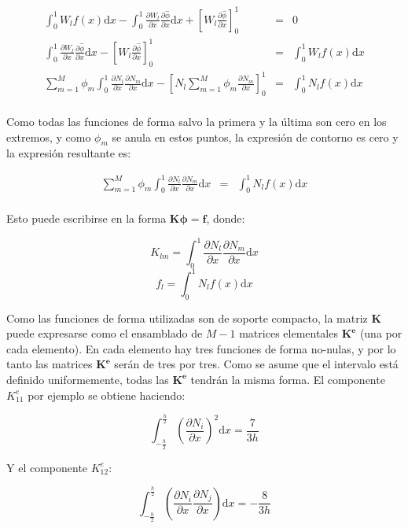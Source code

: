 \documentclass{article}
\def\intzeroone{\int_{0}^1}
\def\dx{\mbox{d}x}
\def\summ{\sum_{m=1}^M}
\def\partialx#1{\frac{\partial #1}{\partial x}}
\def\hatphi{\hat{\phi}}
\begin{document}
\begin{enumerate}[1)]
{        \begin{eqnarray*}
            \intzeroone W_l f(x) \dx - 
            \intzeroone \partialx{W_l} \partialx{\hatphi} \dx + 
            \left[ W_l \partialx{\hatphi} \right]_0^1  &=& 0 \\
            \intzeroone \partialx{W_l} \partialx{\hatphi} \dx -
            \left[ W_l \partialx{\hatphi} \right]_0^1 &=& 
            \intzeroone W_l f(x) \dx \\
            \summ \phi_m \intzeroone \partialx{N_l} \partialx{N_m} \dx -
            \left[ N_l \summ \phi_m \partialx{N_m} \right]_0^1 &=& \intzeroone N_l f(x) \dx  \\
        \end{eqnarray*}

        Como todas las funciones de forma salvo la primera y la última son cero en los extremos,
        y como $\phi_m$ se anula en estos puntos, la expresión de contorno es cero y la expresión
        resultante es:

        \begin{eqnarray*}
            \summ \phi_m \intzeroone \partialx{N_l} \partialx{N_m} \dx
            &=& \intzeroone N_l f(x) \dx  \\
        \end{eqnarray*}

        Esto puede escribirse en la forma $\boldsymbol{K} \boldsymbol{\phi} = \boldsymbol{f}$,
        donde:

        \[ K_{lm} = \intzeroone \partialx{N_l} \partialx{N_m} \dx \]
        \[ f_l = \intzeroone N_l f(x) \dx \]

        Como las funciones de forma utilizadas son de soporte compacto, la matriz
        $\boldsymbol{K}$ puede expresarse como el ensamblado de $M-1$ matrices
        elementales $\boldsymbol{K^e}$ (una por cada elemento). En cada elemento
        hay tres funciones de forma no-nulas, y por lo tanto las matrices
        $\boldsymbol{K^e}$ serán de tres por tres. Como se asume que el intervalo
        está definido uniformemente, todas las $\boldsymbol{K^e}$ tendrán la misma
        forma. El componente $K_{1 1}^e$ por ejemplo se obtiene haciendo:

        \[ \int_{-\frac{h}{2}}^{\frac{h}{2}} \left( \partialx{N_i} \right)^2 \dx 
           = \frac{7}{3h} \]

        Y el componente $K_{1 2}^e$:

        \[ \int_{-\frac{h}{2}}^{\frac{h}{2}} 
        \left( \partialx{N_i} \partialx{N_j} \right) \dx 
           = -\frac{8}{3h} \]

}
\end{enumerate}
\end{document}
